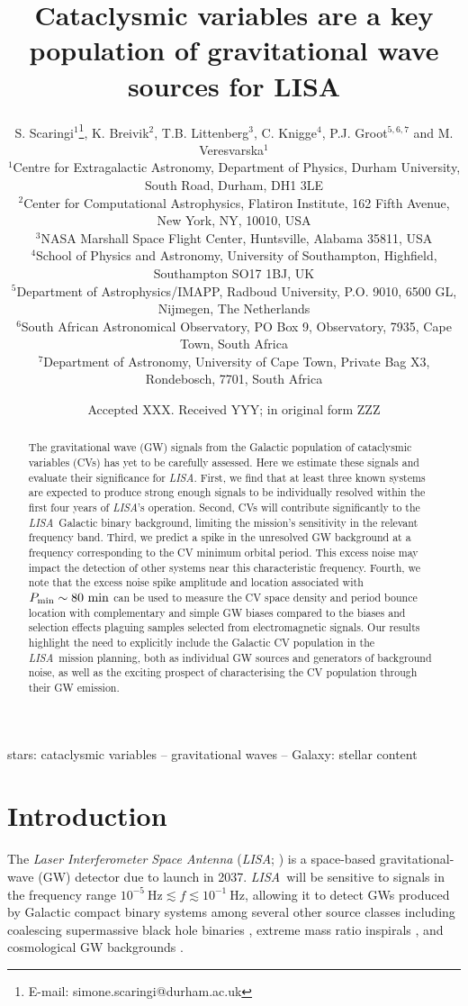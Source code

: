\documentclass[fleqn,usenatbib]{mnras}
\title[LISA CVs]{Cataclysmic variables are a key population of gravitational wave sources for LISA}
\author[S. Scaringi et al.]{
S. Scaringi$^{1}$\thanks{E-mail: simone.scaringi@durham.ac.uk},
K. Breivik$^{2}$,
T.B. Littenberg$^{3}$,
C. Knigge$^{4}$,
P.J. Groot$^{5,6,7}$ and
M. Veresvarska$^{1}$
\\
$^{1}$Centre for Extragalactic Astronomy, Department of Physics, Durham University, South Road, Durham, DH1 3LE\\
$^{2}$Center for Computational Astrophysics, Flatiron Institute, 162 Fifth Avenue, New York, NY, 10010, USA\\
$^{3}$NASA Marshall Space Flight Center, Huntsville, Alabama 35811, USA\\
$^{4}$School of Physics and Astronomy, University of Southampton, Highfield, Southampton SO17 1BJ, UK\\
$^{5}$Department of Astrophysics/IMAPP, Radboud University, P.O. 9010, 6500 GL, Nijmegen, The Netherlands\\
$^{6}$South African Astronomical Observatory, PO Box 9, Observatory, 7935, Cape Town, South Africa\\
$^{7}$Department of Astronomy, University of Cape Town, Private Bag X3, Rondebosch, 7701, South Africa\\
}
\date{Accepted XXX. Received YYY; in original form ZZZ}
\newcommand{\lisa}{{\it LISA}}
\begin{document}
\maketitle

\begin{abstract}
The gravitational wave (GW) signals from the Galactic population of cataclysmic variables (CVs) has yet to be carefully assessed. Here we estimate these signals and evaluate their significance for \lisa. First, we find that at least three known systems are expected to produce strong enough signals to be individually resolved within the first four years of \lisa's operation. Second, CVs will contribute significantly to the \lisa\ Galactic binary background, limiting the mission's sensitivity in the relevant frequency band. Third, we predict a spike in the unresolved GW background at a frequency corresponding to the CV minimum orbital period. This excess noise may impact the detection of other systems near this characteristic frequency. Fourth, we note that the excess noise spike amplitude and location associated with $P_{\rm{min}}\sim80~\mathrm{min}$ can be used to measure the CV space density and period bounce location with complementary and simple GW biases compared to the biases and selection effects plaguing samples selected from electromagnetic signals. Our results highlight the need to explicitly include the Galactic CV population in the \lisa\ mission planning, both as individual GW sources and generators of background noise, as well as the exciting prospect of characterising the CV population through their GW emission.
\end{abstract}
    
    
\begin{keywords}
    stars: cataclysmic variables -- gravitational waves -- Galaxy: stellar content 
\end{keywords}


\section{Introduction}
\label{sec:intro}

The \textit{Laser Interferometer Space Antenna} (\lisa; \citealt{lisa17}) is a space-based gravitational-wave (GW) detector due to launch in 2037. \lisa\ will be sensitive to signals in the frequency range $10^{-5}~\mathrm{Hz} \lesssim f \lesssim 10^{-1}~\mathrm{Hz}$, allowing 
it to detect GWs produced by Galactic compact binary systems among several other source classes including coalescing supermassive black hole binaries \citep[e.g.][]{Klein2016, Bellovary2019}, extreme mass ratio inspirals \citep[e.g.][]{Berti2006, Barack2007}, and cosmological GW backgrounds \citep[][]{Caprini2016, Bartolo2016}.
\end{document}
